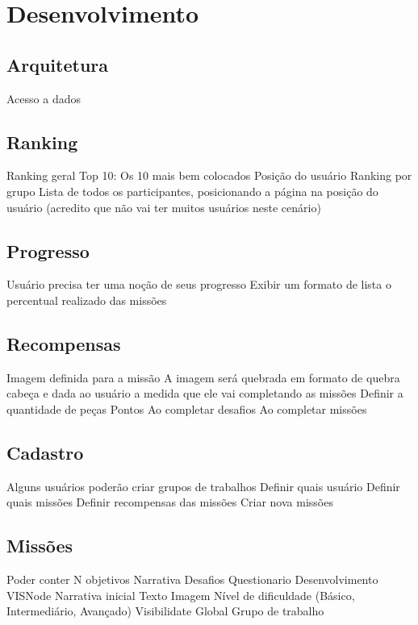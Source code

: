 \documentclass[
	12pt,				%
	oneside,			%
	a4paper,			%
	english,			%
	french,				%
	spanish,			%
	brazil,				%
	]{abntex2}
\begin{document}
\chapter{Desenvolvimento} 


\section{Arquitetura}
Acesso a dados

\section{Ranking}

Ranking geral
Top 10: Os 10 mais bem colocados 
Posição do usuário
Ranking por grupo
Lista de todos os participantes, posicionando a página na posição do usuário (acredito que não vai ter muitos usuários neste cenário) 

\section{Progresso}

Usuário precisa ter uma noção de seus progresso
Exibir um formato de lista o percentual realizado das missões 

\section{Recompensas}

Imagem definida para a missão
A imagem será quebrada em formato de quebra cabeça e dada ao usuário a medida que ele vai completando as missões
Definir a quantidade de peças
Pontos
Ao completar desafios
Ao completar missões


\section{Cadastro}


Alguns usuários poderão criar grupos de trabalhos
Definir quais usuário
Definir quais missões
Definir recompensas das missões
Criar nova missões

\section{Missões}

Poder conter N objetivos
Narrativa
Desafios
Questionario
Desenvolvimento VISNode
Narrativa inicial
Texto
Imagem
Nível de dificuldade (Básico, Intermediário, Avançado)
Visibilidate
Global
Grupo de trabalho
\end{document}
